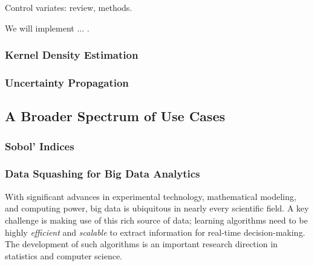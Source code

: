 \documentclass[11pt]{NSFamsart}
\begin{document}
Control variates: review, methods.

We will implement ... .


\subsubsection{Kernel Density Estimation}

\subsubsection{Uncertainty Propagation}





\subsection{A Broader Spectrum of Use Cases}

\subsubsection{Sobol' Indices}

\subsubsection{Data Squashing for Big Data Analytics}

With significant advances in experimental technology, mathematical modeling, and computing power, big data is ubiquitous in nearly every scientific field. A key challenge is making use of this rich source of data; learning algorithms need to be highly \textit{efficient} and \textit{scalable} to extract information for real-time decision-making. The development of such algorithms is an important research direction in statistics and computer science.
\end{document}
